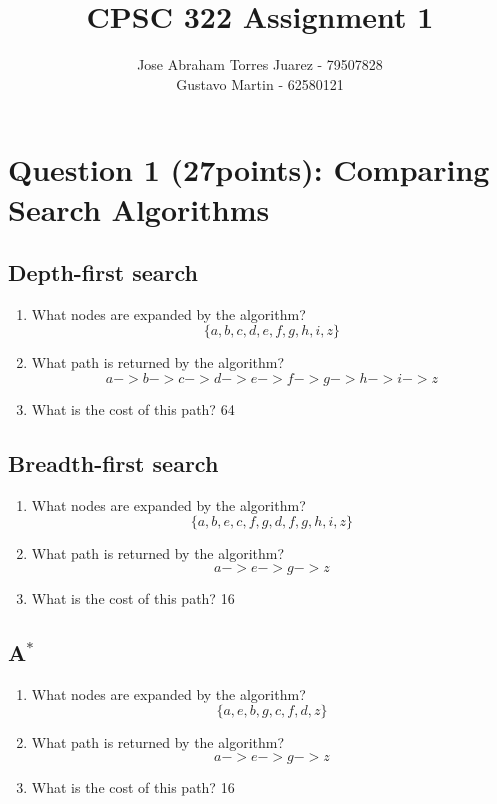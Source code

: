 \documentclass{article}
\def\ans#1{{\color{ans}#1}}
\newcommand{\centerfig}[2]{\begin{center}\texttt{[image: \#2]}\end{center}}
\begin{document}
\title{CPSC 322 Assignment 1}
\author{
    Jose Abraham Torres Juarez - 79507828 \\
    Gustavo Martin - 62580121
}
\date{}
\maketitle
\vspace{-2em}


\section{Question 1 (27points): Comparing Search Algorithms}

\subsection{Depth-first search}
\begin{enumerate}[label=(\alph*)]
    \item What nodes are expanded by the algorithm?
    \ans{
        \[\{a, b, c, d, e, f, g, h, i, z\}\]
    }
    \item What path is returned by the algorithm?
    \ans{
        \[a->b->c->d->e->f->g->h->i->z\]
    }
    \item What is the cost of this path?
    \ans{
        64
    }
\end{enumerate}

\subsection{Breadth-first search}
\begin{enumerate}[label=(\alph*)]
    \item What nodes are expanded by the algorithm?
    \ans{
        \[\{a, b, e, c, f, g, d, f, g, h, i, z\}\]
    }
    \item What path is returned by the algorithm?
    \ans{
        \[a->e->g->z\]
    }
    \item What is the cost of this path?
    \ans{
        16
    }
\end{enumerate}

\subsection{A$^*$}
\begin{enumerate}[label=(\alph*)]
    \item What nodes are expanded by the algorithm?
    \ans{
        \[\{a, e, b, g, c, f, d, z\}\]
    }
    \item What path is returned by the algorithm?
    \ans{
        \[a->e->g->z\]
    }
    \item What is the cost of this path?
    \ans{
        16
    }
\end{enumerate}
\end{document}
